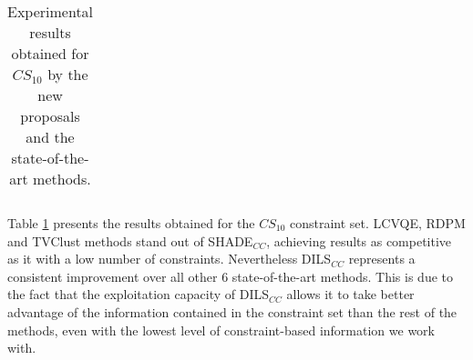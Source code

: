 \begin{table}[!h]
{\begin{tabular}{lcccccccc}
	\end{tabular}}
	
	\caption{Experimental results obtained for $CS_{10}$ by the new proposals and the state-of-the-art methods.}
	\label{tab:resultsSOTA10}
\end{table}

Table \ref{tab:resultsSOTA10} presents the results obtained for the $CS_{10}$ constraint set. \acs{LCVQE}, \acs{RDPM} and \acs{TVClust} methods stand out of \acs{SHADE}$_{CC}$, achieving results as competitive as it with a low number of constraints. Nevertheless \acs{DILS}$_{CC}$ represents a consistent improvement over all other 6 state-of-the-art methods. This is due to the fact that the exploitation capacity of \acs{DILS}$_{CC}$ allows it to take better advantage of the information contained in the constraint set than the rest of the methods, even with the lowest level of constraint-based information we work with.

